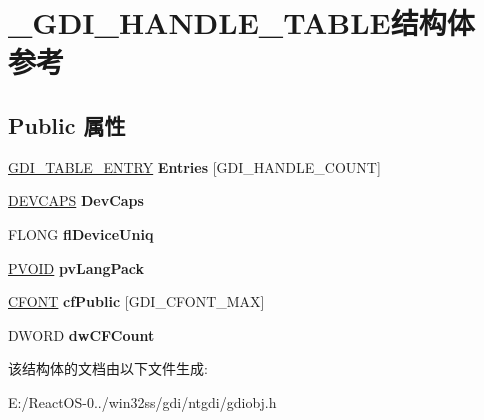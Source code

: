 \hypertarget{struct___g_d_i___h_a_n_d_l_e___t_a_b_l_e}{}\section{\+\_\+\+G\+D\+I\+\_\+\+H\+A\+N\+D\+L\+E\+\_\+\+T\+A\+B\+L\+E结构体 参考}
\label{struct___g_d_i___h_a_n_d_l_e___t_a_b_l_e}
\subsection*{Public 属性}
\begin{DoxyCompactItemize}
\item 
\mbox{\label{struct___g_d_i___h_a_n_d_l_e___t_a_b_l_e_af99d9886e511a69fce803e1d2d333210}} 
\hyperlink{struct___g_d_i___t_a_b_l_e___e_n_t_r_y}{G\+D\+I\+\_\+\+T\+A\+B\+L\+E\+\_\+\+E\+N\+T\+RY} {\bfseries Entries} \mbox{[}G\+D\+I\+\_\+\+H\+A\+N\+D\+L\+E\+\_\+\+C\+O\+U\+NT\mbox{]}
\item 
\mbox{\label{struct___g_d_i___h_a_n_d_l_e___t_a_b_l_e_ab63b38c2f117d86da4998bf73943ea61}} 
\hyperlink{struct___d_e_v_c_a_p_s}{D\+E\+V\+C\+A\+PS} {\bfseries Dev\+Caps}
\item 
\mbox{\label{struct___g_d_i___h_a_n_d_l_e___t_a_b_l_e_a711f15c45276b31d8b320c4d6f710954}} 
F\+L\+O\+NG {\bfseries fl\+Device\+Uniq}
\item 
\mbox{\label{struct___g_d_i___h_a_n_d_l_e___t_a_b_l_e_af5adaff5f877fcee4b5643780b7dd52e}} 
\hyperlink{interfacevoid}{P\+V\+O\+ID} {\bfseries pv\+Lang\+Pack}
\item 
\mbox{\label{struct___g_d_i___h_a_n_d_l_e___t_a_b_l_e_a397cdee0df6f3786ece593ad1fc7117e}} 
\hyperlink{struct___c_f_o_n_t}{C\+F\+O\+NT} {\bfseries cf\+Public} \mbox{[}G\+D\+I\+\_\+\+C\+F\+O\+N\+T\+\_\+\+M\+AX\mbox{]}
\item 
\mbox{\label{struct___g_d_i___h_a_n_d_l_e___t_a_b_l_e_a6f23e88aeb360007ee92e4ad9083c76c}} 
D\+W\+O\+RD {\bfseries dw\+C\+F\+Count}
\end{DoxyCompactItemize}


该结构体的文档由以下文件生成\+:\begin{DoxyCompactItemize}
\item 
E\+:/\+React\+O\+S-\/0../win32ss/gdi/ntgdi/gdiobj.\+h\end{DoxyCompactItemize}
